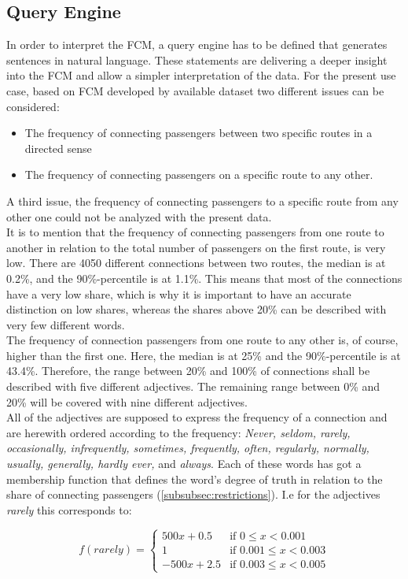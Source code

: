 \documentclass[conference]{IEEEtran}
\begin{document}
\subsection{Query Engine}
In order to interpret the FCM, a query engine has to be defined that generates sentences in natural language. These statements are delivering a deeper insight into the FCM and allow a simpler interpretation of the data. For the present use case, based on FCM developed by available dataset two different issues can be considered: 
\begin{itemize}
\item The frequency of connecting passengers between two specific routes in a directed sense
\item The frequency of connecting passengers on a specific route to any other.
\end{itemize}
A third issue, the frequency of connecting passengers to a specific route from any other one could not be analyzed with the present data.\\
It is to mention that the frequency of connecting passengers from one route to another in relation to the total number of passengers on the first route, is very low. There are 4050 different connections between two routes, the median is at 0.2\%, and the 90\%-percentile is at 1.1\%. This means that most of the connections have a very low share, which is why it is important to have an accurate distinction on low shares, whereas the shares above 20\% can be described with very few different words.\\
The frequency of connection passengers from one route to any other is, of course, higher than the first one. Here, the median is at 25\% and the 90\%-percentile is at 43.4\%. Therefore, the range between 20\% and 100\% of connections shall be described with five different adjectives. The remaining range between 0\% and 20\% will be covered with nine different adjectives.\\
All of the adjectives are supposed to express the frequency of a connection and are herewith ordered according to the frequency: \emph{Never, seldom, rarely, occasionally, infrequently, sometimes, frequently, often, regularly, normally, usually, generally, hardly ever,} and \emph{always}. Each of these words has got a membership function that defines the word's degree of truth in relation to the share of connecting passengers (\ref{subsubsec:restrictions}). I.e for the adjectives \emph{rarely} this corresponds to:

\begin{equation}
f(rarely)= \begin{cases}
500x + 0.5 & \text{if } 0 \leqslant x < 0.001\\
1 & \text{if } 0.001 \leqslant x < 0.003\\
-500x + 2.5 & \text{if } 0.003 \leqslant x < 0.005
\end{cases}
\end{equation}
\end{document}
